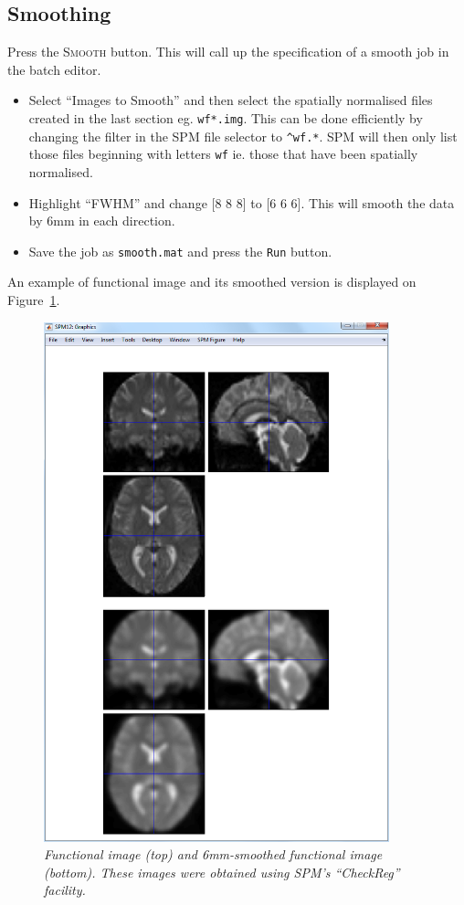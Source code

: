 \subsection{Smoothing}

Press the \textsc{Smooth} button. This will call up the specification of a smooth job in the batch editor.

\begin{itemize}
\item Select ``Images to Smooth'' and then select the spatially normalised files created in the last section eg. \texttt{wf*.img}. This can be done efficiently by changing the filter in the SPM file selector to \texttt{\textasciicircum wf.*}. SPM will then only list those files beginning with letters \texttt{wf} ie. those that have been spatially normalised.
\item Highlight ``FWHM'' and change [8 8 8] to [6 6 6]. This will smooth the data by 6mm in each direction.
\item Save the job as \texttt{smooth.mat} and press the \texttt{Run} button.
\end{itemize}

An example of functional image and its smoothed version is displayed on Figure~\ref{aud_smooth}.

\begin{figure}
\begin{center}
\includegraphics[width=100mm]{auditory/smooth}
\caption{\em Functional image (top) and 6mm-smoothed functional image (bottom). These images were obtained using SPM's ``CheckReg'' facility. \label{aud_smooth}}
\end{center}
\end{figure}

